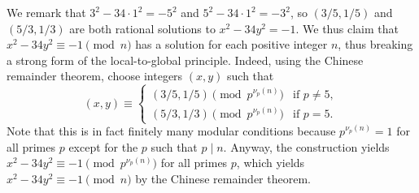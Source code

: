 \documentclass[../notes.tex]{subfiles}
\begin{document}
\begin{remark}
	We remark that $3^2-34\cdot1^2=-5^2$ and $5^2-34\cdot1^2=-3^2$, so $(3/5,1/5)$ and $(5/3,1/3)$ are both rational solutions to $x^2-34y^2=-1$. We thus claim that $x^2-34y^2\equiv-1\pmod n$ has a solution for each positive integer $n$, thus breaking a strong form of the local-to-global principle. Indeed, using the Chinese remainder theorem, choose integers $(x,y)$ such that
	\[(x,y)\equiv\begin{cases}
		(3/5,1/5) \pmod{p^{\nu_p(n)}} & \text{if }p\ne5, \\
		(5/3,1/3) \pmod{p^{\nu_p(n)}} & \text{if }p=5.
	\end{cases}\]
	Note that this is in fact finitely many modular conditions because $p^{\nu_p(n)}=1$ for all primes $p$ except for the $p$ such that $p\mid n$. Anyway, the construction yields $x^2-34y^2\equiv-1\pmod{p^{\nu_p(n)}}$ for all primes $p$, which yields $x^2-34y^2\equiv-1\pmod n$ by the Chinese remainder theorem.
\end{remark}
\end{document}
